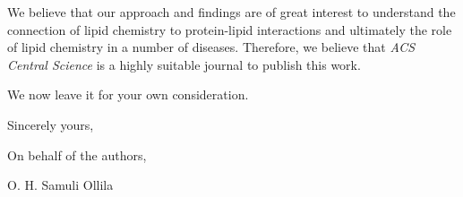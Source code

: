 \documentclass[11pt]{letter}
\begin{document}
We believe that our approach and findings are of great interest to understand the connection of lipid chemistry to protein-lipid interactions  and ultimately the role of lipid chemistry in a number of diseases. Therefore, we believe that \textit{ACS Central Science} is a highly suitable journal to publish this work.   

We now leave it for your own consideration.

Sincerely yours,

On behalf of the authors,

O. H. Samuli Ollila
\end{document}
